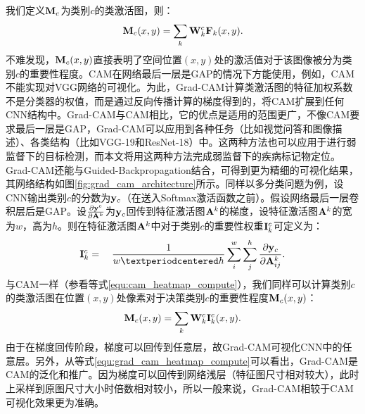 我们定义$\mathbf{M}_c$为类别$c$的类激活图，则：
\begin{equation}\label{equ:cam_heatmap_compute}
\mathbf{M}_{c}(x, y)=\sum_{k} \mathbf{W}_{k}^{c} \mathbf{F}_{k}(x, y).
\end{equation}
不难发现，$\mathbf{M}_{c}(x, y)$直接表明了空间位置$(x,y)$处的激活值对于该图像被分为类别$c$的重要性程度。CAM在网络最后一层是GAP的情况下方能使用，例如，CAM不能实现对VGG网络的可视化。为此，Grad-CAM计算类激活图的特征加权系数不是分类器的权值，而是通过反向传播计算的梯度得到的，将CAM扩展到任何CNN结构中。Grad-CAM与CAM相比，它的优点是适用的范围更广，不像CAM要求最后一层是GAP，Grad-CAM可以应用到各种任务（比如视觉问答和图像描述）、各类结构（比如VGG-19和ResNet-18）中。这两种方法也可以应用于进行弱监督下的目标检测，而本文将用这两种方法完成弱监督下的疾病标记物定位。Grad-CAM还能与Guided-Backpropagation结合，可得到更为精细的可视化结果，其网络结构如图\ref{fig:grad_cam_architecture}所示。同样以多分类问题为例，设CNN输出类别$c$的分数为$\mathbf{y}_c$（在送入Softmax激活函数之前）。假设网络最后一层卷积层后是GAP。设$\frac{\partial \mathbf{y}^{c}}{\partial \mathbf{A}^{k}}$为$\mathbf{y}_c$回传到特征激活图$\mathbf{A}^{k}$的梯度，设特征激活图$\mathbf{A}^{k}$的宽为$w$，高为$h$。则在特征激活图$\mathbf{A}^{k}$中对于类别$c$的重要性权重$\mathbf{I}_{k}^{c}$可定义为：
\begin{equation}
\ve{I}_{k}^{c}=\quad \frac{1}{w·h} \sum_{i}^{w} \sum_{j}^{h} \frac{\partial \ve{y}_{c}}{\partial \ve{A}_{i j}^{k}}.
\end{equation}
与CAM一样（参看等式\ref{equ:cam_heatmap_compute}），我们同样可以计算类别$c$的类激活图在位置$(x,y)$处像素对于决策类别$c$的重要性程度$\mathbf{M}_c(x, y)$：
\begin{equation}\label{equ:grad_cam_heatmap_compute}
\mathbf{M}_{c}(x, y)=\sum_{k} \mathbf{W}_{k}^{c} \mathbf{I}_{k}^c(x, y).
\end{equation}
由于在梯度回传阶段，梯度可以回传到任意层，故Grad-CAM可视化CNN中的任意层。另外，从等式\ref{equ:grad_cam_heatmap_compute}可以看出，Grad-CAM是CAM的泛化和推广。因为梯度可以回传到网络浅层（特征图尺寸相对较大），此时上采样到原图尺寸大小时倍数相对较小，所以一般来说，Grad-CAM相较于CAM可视化效果更为准确。
